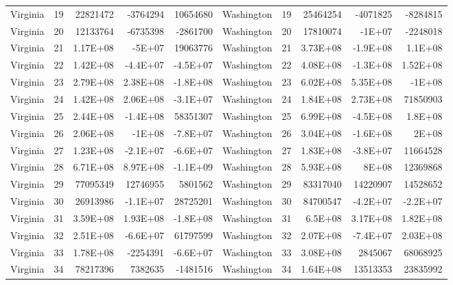 \begin{landscape}
\begin{singlespace}
\begin{longtable}{lrrrr|lrrrr}
		Virginia &  19 & 22821472 & -3764294 & 10654680 & Washington &  19 & 25464254 & -4071825 & -8284815 \\
		Virginia &  20 & 12133764 & -6735398 & -2861700 & Washington &  20 & 17810074 & -1E+07 & -2248018 \\
		Virginia &  21 & 1.17E+08 & -5E+07 & 19063776 & Washington &  21 & 3.73E+08 & -1.9E+08 & 1.1E+08 \\
		Virginia &  22 & 1.42E+08 & -4.4E+07 & -4.5E+07 & Washington &  22 & 4.08E+08 & -1.3E+08 & 1.52E+08 \\
		Virginia &  23 & 2.79E+08 & 2.38E+08 & -1.8E+08 & Washington &  23 & 6.02E+08 & 5.35E+08 & -1E+08 \\
		Virginia &  24 & 1.42E+08 & 2.06E+08 & -3.1E+07 & Washington &  24 & 1.84E+08 & 2.73E+08 & 71850903 \\
		Virginia &  25 & 2.44E+08 & -1.4E+08 & 58351307 & Washington &  25 & 6.99E+08 & -4.5E+08 & 1.8E+08 \\
		Virginia &  26 & 2.06E+08 & -1E+08 & -7.8E+07 & Washington &  26 & 3.04E+08 & -1.6E+08 & 2E+08 \\
		Virginia &  27 & 1.23E+08 & -2.1E+07 & -6.6E+07 & Washington &  27 & 1.83E+08 & -3.8E+07 & 11664528 \\
		Virginia &  28 & 6.71E+08 & 8.97E+08 & -1.1E+09 & Washington &  28 & 5.93E+08 & 8E+08 & 12369868 \\
		Virginia &  29 & 77095349 & 12746955 & 5801562 & Washington &  29 & 83317040 & 14220907 & 14528652 \\
		Virginia &  30 & 26913986 & -1.1E+07 & 28725201 & Washington &  30 & 84700547 & -4.2E+07 & -2.2E+07 \\
		Virginia &  31 & 3.59E+08 & 1.93E+08 & -1.8E+08 & Washington &  31 & 6.5E+08 & 3.17E+08 & 1.82E+08 \\
		Virginia &  32 & 2.51E+08 & -6.6E+07 & 61797599 & Washington &  32 & 2.07E+08 & -7.4E+07 & 2.03E+08 \\
		Virginia &  33 & 1.78E+08 & -2254391 & -6.6E+07 & Washington &  33 & 3.08E+08 & 2845067 & 68068925 \\
		Virginia &  34 & 78217396 & 7382635 & -1481516 & Washington &  34 & 1.64E+08 & 13513353 & 23835992\\



\end{longtable}
\end{singlespace}
\end{landscape}
